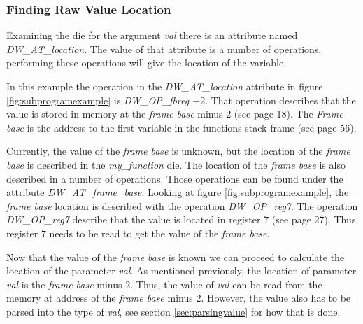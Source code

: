 

\subsubsection{Finding Raw Value Location}
Examining the \gls{die} for the argument \emph{val} there is an attribute named \emph{DW\_AT\_location}.
The value of that attribute is a number of operations, performing these operations will give the location of the variable.


In this example the operation in the \emph{DW\_AT\_location} attribute in figure \ref{fig:subprogramexample} is \emph{DW\_OP\_fbreg $-2$}.
That operation describes that the value is stored in memory at the \emph{frame base} minus $2$ (see \cite{dwarf} page 18).
The \emph{Frame base} is the address to the first variable in the functions stack frame (see \cite{dwarf} page 56).


Currently, the value of the \emph{frame base} is unknown, but the location of the \emph{frame base}  is described in the \emph{my\_function} \gls{die}.
The location of the \emph{frame base} is also described in a number of operations.
Those operations can be found under the attribute \emph{DW\_AT\_frame\_base}.
Looking at figure \ref{fig:subprogramexample}, the \emph{frame base} location is described with the operation \emph{DW\_OP\_reg7}.
The operation \emph{DW\_OP\_reg7} describe that the value is located in register $7$ (see \cite{dwarf} page 27).
Thus register $7$ needs to be read to get the value of the \emph{frame base}.


Now that the value of the \emph{frame base} is known we can proceed to calculate the location of the parameter \emph{val}.
As mentioned previously, the location of parameter \emph{val} is the \emph{frame base} minus $2$.
Thus, the value of \emph{val} can be read from the memory at address of the \emph{frame base} minus $2$.
However, the value also has to be parsed into the type of \emph{val}, see section \ref{sec:parsingvalue} for how that is done.


